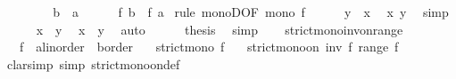 \begin{isabellebody}
\ \ \isamarkupfalse%
\isanewline
\ \ \ \ \isamarkupfalse%
\ {\isachardoublequoteopen}b\ {\isasymle}\ a{\isachardoublequoteclose}\isanewline
\ \ \ \ \isamarkupfalse%
\ {\isachardoublequoteopen}f\ b\ {\isasymle}\ f\ a{\isachardoublequoteclose}\ \isamarkupfalse%
{\isacharparenleft}{\kern0pt}rule\ monoD{\isacharbrackleft}{\kern0pt}OF\ {\isacartoucheopen}mono\ f{\isacartoucheclose}{\isacharbrackright}{\kern0pt}{\isacharparenright}{\kern0pt}\isanewline
\ \ \ \ \isamarkupfalse%
\ {\isachardoublequoteopen}y\ {\isasymle}\ x{\isachardoublequoteclose}\ \isamarkupfalse%
\ x\ y\ \isamarkupfalse%
\ simp\isanewline
\ \ \ \ \isamarkupfalse%
\ {\isachardoublequoteopen}x\ {\isacharequal}{\kern0pt}\ y{\isachardoublequoteclose}\ \isamarkupfalse%
\ {\isacartoucheopen}x\ {\isasymle}\ y{\isacartoucheclose}\ \isamarkupfalse%
\ auto\isanewline
\ \ \ \ \isamarkupfalse%
\ {\isacharquery}{\kern0pt}thesis\ \isamarkupfalse%
\ simp\isanewline
\ \ \isamarkupfalse%
\isanewline
{}\isamarkupfalse%
%
\endisatagproof
{\isafoldproof}%
%
\isadelimproof
\isanewline
%
\endisadelimproof
\isanewline
{}\isamarkupfalse%
\ strict{\isacharunderscore}{\kern0pt}mono{\isacharunderscore}{\kern0pt}inv{\isacharunderscore}{\kern0pt}on{\isacharunderscore}{\kern0pt}range{\isacharcolon}{\kern0pt}\isanewline
\ \ \ f\ {\isacharcolon}{\kern0pt}{\isacharcolon}{\kern0pt}\ {\isachardoublequoteopen}{\isacharprime}{\kern0pt}a{\isacharcolon}{\kern0pt}{\isacharcolon}{\kern0pt}linorder\ {\isasymRightarrow}\ {\isacharprime}{\kern0pt}b{\isacharcolon}{\kern0pt}{\isacharcolon}{\kern0pt}order{\isachardoublequoteclose}\isanewline
\ \ \ {\isachardoublequoteopen}strict{\isacharunderscore}{\kern0pt}mono\ f{\isachardoublequoteclose}\isanewline
\ \ \ {\isachardoublequoteopen}strict{\isacharunderscore}{\kern0pt}mono{\isacharunderscore}{\kern0pt}on\ {\isacharparenleft}{\kern0pt}inv\ f{\isacharparenright}{\kern0pt}\ {\isacharparenleft}{\kern0pt}range\ f{\isacharparenright}{\kern0pt}{\isachardoublequoteclose}\isanewline
%
\isadelimproof
%
\endisadelimproof
%
\isatagproof
{}\isamarkupfalse%
\ {\isacharparenleft}{\kern0pt}clarsimp\ simp{\isacharcolon}{\kern0pt}\ strict{\isacharunderscore}{\kern0pt}mono{\isacharunderscore}{\kern0pt}on{\isacharunderscore}{\kern0pt}def{\isacharparenright}{\kern0pt}\isanewline
\ \ \isamarkupfalse%

\end{isabellebody}

